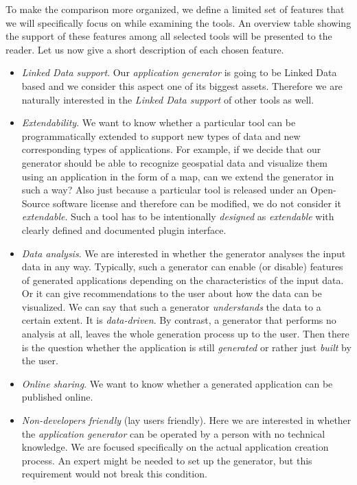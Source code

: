 To make the comparison more organized, we define a limited set of features that we will specifically focus on while examining the tools. An overview table showing the support of these features among all selected tools will be presented to the reader. Let us now give a short description of each chosen feature.

\begin{itemize}
\item \emph{Linked Data support}. Our \emph{application generator} is going to be Linked Data based and we consider this aspect one of its biggest assets. Therefore we are naturally interested in the \emph{Linked Data support} of other tools as well.
\item \emph{Extendability}. We want to know whether a particular tool can be programmatically extended to support new types of data and new corresponding types of applications. For example, if we decide that our generator should be able to recognize geospatial data and visualize them using an application in the form of a map, can we extend the generator in such a way? Also just because a particular tool is released under an Open-Source software license and therefore can be modified, we do not consider it \emph{extendable}. Such a tool has to be intentionally \emph{designed} as \emph{extendable} with clearly defined and documented plugin interface.
\item \emph{Data analysis}. We are interested in whether the generator analyses the input data in any way. Typically, such a generator can enable (or disable)  features of generated applications depending on the characteristics of the input data. Or it can give recommendations to the user about how the data can be visualized. We can say that such a generator \emph{understands} the data to a certain extent. It is \emph{data-driven}. By contrast, a generator that performs no analysis at all, leaves the whole generation process up to the user. Then there is the question whether the application is still \emph{generated} or rather just \emph{built} by the user.
\item \emph{Online sharing}. We want to know whether a generated application can be published online.
\item \emph{Non-developers friendly} (lay users friendly). Here we are interested in whether the \emph{application generator} can be operated by a person with no technical knowledge. We are focused specifically on the actual application creation process. An expert might be needed to set up the generator, but this requirement would not break this condition.

\end{itemize}
